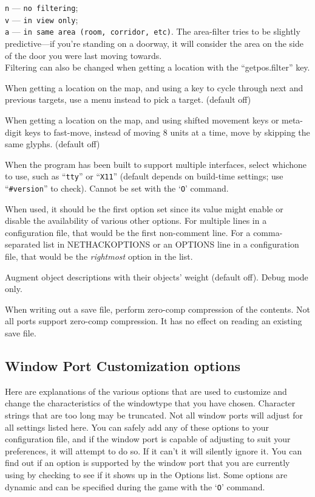 {\tt n} --- \verb#no filtering#;\\
{\tt v} --- \verb#in view only#;\\
{\tt a} --- \verb#in same area (room, corridor, etc)#.
The area-filter tries to be slightly
predictive---if
you're standing on a doorway, it will consider the area on the side of
the door you were last moving towards.\\
Filtering can also be changed when getting a location with
the ``getpos.filter'' key.
\item[\ib{whatis\verb+_+menu}]
When getting a location on the map, and using a key to cycle through
next and previous targets, use a menu instead to pick a target.
(default off)
\item[\ib{whatis\verb+_+moveskip}]
When getting a location on the map, and using shifted movement keys or
meta-digit keys to fast-move, instead of moving 8 units at a time,
move by skipping the same glyphs.
(default off)
\item[\ib{windowtype}]
When the program has been built to support multiple interfaces,
select whichone to use, such as ``{\tt tty}'' or ``{\tt X11}''
(default depends on build-time settings; use ``{\tt \#version}'' to check).
Cannot be set with the `{\tt O}' command.

When used, it should be the first option set since its value might
enable or disable the availability of various other options.
For multiple lines in a configuration file, that would be the first
non-comment line.
For a comma-separated list in NETHACKOPTIONS or an OPTIONS line in a
configuration file, that would be the {\it rightmost\/} option in the list.
\item[\ib{wizweight}]
Augment object descriptions with their objects' weight (default off).
Debug mode only.
\item[\ib{zerocomp}]
When writing out a save file, perform zero-comp compression of the
contents. Not all ports support zero-comp compression. It has no effect
on reading an existing save file.
\elist

\subsection*{Window Port Customization options}

Here are explanations of the various options that are
used to customize and change the characteristics of the
windowtype that you have chosen.
Character strings that are too long may be truncated.
Not all window ports will adjust for all settings listed
here.  You can safely add any of these options to your
configuration file, and if the window port is capable of adjusting
to suit your preferences, it will attempt to do so. If it
can't it will silently ignore it.  You can find out if an
option is supported by the window port that you are currently
using by checking to see if it shows up in the Options list.
Some options are dynamic and can be specified during the game
with the `{\tt O}' command.

